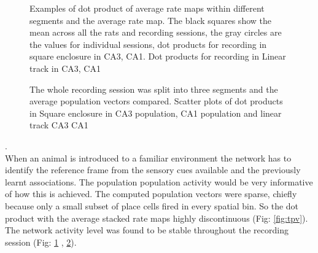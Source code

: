 \begin{figure}[htb!]
\centering
{}
\caption[Population Vector time course]{Examples of dot product of average rate maps within different segments and the average rate map. The black squares show the mean across all the rats and recording sessions, the gray circles are the values for individual sessions, dot products for recording in square enclosure in  CA3,  CA1. Dot products for recording in Linear track in  CA3,  CA1}
\label{fig:pvchunks}
\end{figure}

\begin{figure}[htb!]
\centering
{}
\caption[CA3 Population Vector analysis]{The whole recording session was split into three segments and the average population vectors compared. Scatter plots of dot products in Square enclosure in  CA3 population,  CA1 population and linear track  CA3  CA1}
\label{fig:poolpvchunk}
\end{figure}

.\\[2cm]
When an animal is introduced to a familiar environment the network has to identify the reference frame from the sensory cues available and the previously learnt associations. The population population activity would be very informative of how this is achieved. The computed population vectors were sparse, chiefly because only a small subset of place cells fired in every spatial bin. So the dot product with the average stacked rate maps highly discontinuous (Fig: \ref{fig:tpv}). The network activity level was found to be  stable throughout the recording session (Fig: \ref{fig:pvchunks} , \ref{fig:poolpvchunk}).





